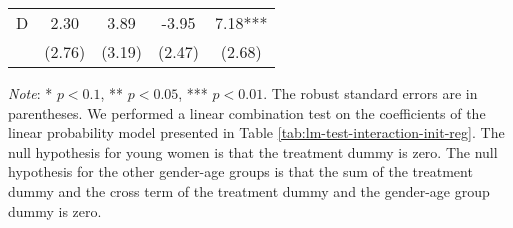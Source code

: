\documentclass[12pt, a4paper]{article}
\begin{document}
\begin{table}[H]
\begin{threeparttable}
\begin{tabular}[t]{lcccc}
\hspace{1em}D & 2.30 & 3.89 & -3.95 & 7.18***\\
\hspace{1em} & (2.76) & (3.19) & (2.47) & (2.68)\\
\bottomrule
\end{tabular}
\begin{tablenotes}
\item \emph{Note}: * $p < 0.1$, ** $p < 0.05$, *** $p < 0.01$. The robust standard errors are in parentheses. We performed a linear combination test on the coefficients of the linear probability model presented in Table \ref{tab:lm-test-interaction-init-reg}. The null hypothesis for young women is that the treatment dummy is zero. The null hypothesis for the other gender-age groups is that the sum of the treatment dummy and the cross term of the treatment dummy and the gender-age group dummy is zero.
\end{tablenotes}
\end{threeparttable}
\end{table}
\end{document}
